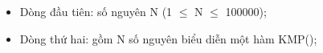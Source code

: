 \begin{itemize}
	\item     Dòng đầu tiên: số nguyên N (1  $\le$  N  $\le$  100000);   
	\item     Dòng thứ hai: gồm N số nguyên biểu diễn một hàm KMP();   
\end{itemize}

\